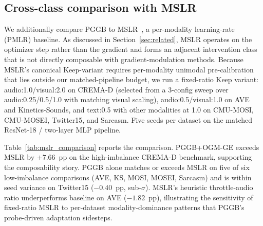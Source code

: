 \documentclass{article}
\begin{document}
\subsection{Cross-class comparison with MSLR}
\label{app:mslr}

We additionally compare PGGB to MSLR~\citep{yao2022mslr}, a per-modality learning-rate (PMLR) baseline. As discussed in Section~\ref{sec:related}, MSLR operates on the optimizer step rather than the gradient and forms an adjacent intervention class that is not directly composable with gradient-modulation methods. Because MSLR's canonical Keep-variant requires per-modality unimodal pre-calibration that lies outside our matched-pipeline budget, we run a fixed-ratio Keep variant: audio:1.0/visual:2.0 on CREMA-D (selected from a 3-config sweep over audio:0.25/0.5/1.0 with matching visual scaling), audio:0.5/visual:1.0 on AVE and Kinetics-Sounds, and text:0.5 with other modalities at 1.0 on CMU-MOSI, CMU-MOSEI, Twitter15, and Sarcasm. Five seeds per dataset on the matched ResNet-18 / two-layer MLP pipeline.

Table~\ref{tab:mslr_comparison} reports the comparison. PGGB+OGM-GE exceeds MSLR by $+7.66$~pp on the high-imbalance CREMA-D benchmark, supporting the composability story. PGGB alone matches or exceeds MSLR on five of six low-imbalance comparisons (AVE, KS, MOSI, MOSEI, Sarcasm) and is within seed variance on Twitter15 ($-0.40$~pp, sub-$\sigma$). MSLR's heuristic throttle-audio ratio underperforms baseline on AVE ($-1.82$~pp), illustrating the sensitivity of fixed-ratio MSLR to per-dataset modality-dominance patterns that PGGB's probe-driven adaptation sidesteps.
\end{document}
